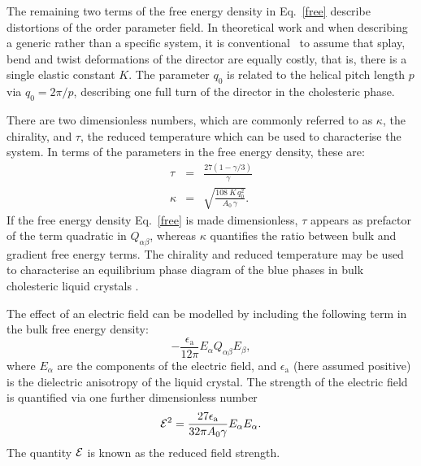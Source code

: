 \documentclass[12pt]{article}
\begin{document}
The remaining two terms of the free energy density in Eq.~\ref{free} describe
distortions of the order parameter field. In theoretical work and when
describing a generic rather than a specific system, it is 
conventional~\cite{mermin,deGennes} to
assume that splay, bend and twist deformations of the director are equally
costly, that is, there is a single elastic constant $K$. The parameter $q_0$
is related to the helical pitch length $p$ via $q_0=2\pi/p$,
describing one full turn of the director in the cholesteric phase.

There are two dimensionless numbers, which are commonly referred to as
$\kappa$, the chirality, and  $\tau$, the reduced temperature
\cite{mermin} which can be used to characterise the system. In terms of
the parameters in the free energy density, these are:
\begin{eqnarray}\label{cntrl-param} 
\tau&=&\frac{27(1-\gamma/3)}{\gamma}\label{tau}\\
\kappa&=&\sqrt{\frac{108\ K\, q_0^2}{A_0\, \gamma}}\label{kappa}.
\end{eqnarray}
If the free energy density Eq.~\ref{free} is made dimensionless, $\tau$
appears as prefactor of the term  quadratic in $Q_{\alpha\beta}$,
whereas $\kappa$
quantifies the ratio between bulk and  gradient free energy terms. The
chirality and reduced temperature may be used to characterise an equilibrium
phase diagram of the blue phases in bulk cholesteric liquid crystals
\cite{mermin,henrichfield}.

The effect of an electric field can be modelled by including the following
term in the bulk free energy density:
\begin{equation}
-\frac{\epsilon_\mathrm{a}}{12\pi} E_{\alpha}Q_{\alpha\beta}E_{\beta},
\end{equation} 
where $E_{\alpha}$ are the components of the electric field, and 
$\epsilon_\mathrm{a}$ (here assumed positive) is the dielectric anisotropy
of the liquid
crystal. The strength of the electric field is quantified via
one further dimensionless number
\begin{equation}
{\cal E}^2 = \frac{27 \epsilon_\mathrm{a}}{32 \pi A_0 \gamma} E_\alpha E_\alpha.
\end{equation}
The quantity ${\cal E}$ is known as the reduced field strength.
\end{document}
